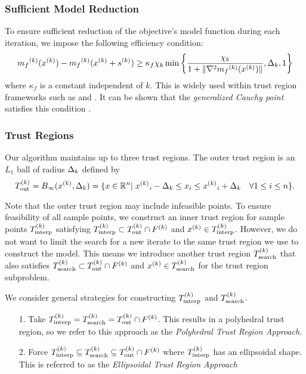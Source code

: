 \subsubsection{Sufficient Model Reduction}

To ensure sufficient reduction of the objective's model function during each iteration, we impose the following efficiency condition:
\begin{equation}
\label{efficiency}
{{m}_f}^{(k)}({x^{(k)}}) - {{m}_f}^{(k)}({x^{(k)}} + {{s}^{(k)}}) \ge \kappa_f \chi_k \min\left\{ \frac{\chi_k}{1+\|\nabla^2 {{m}_f}^{(k)}({x^{(k)}})\|}, \Delta_k, 1 \right\}
\end{equation}
where $\kappa_f$ is a constant independent of $k$.
This is widely used within trust region frameworks such as \cite{Conejo:2013:GCT:2620806.2621814} and \cite{Conn:2000:TM:357813}.
It can be shown that the \emph{generalized Cauchy point} satisfies this condition \cite{Conn:2000:TM:357813}.


\subsubsection{Trust Regions}
Our algorithm maintains up to three trust regions.
The outer trust region is an $L_1$ ball of radius $ \Delta_k $ defined by
\begin{equation}
\label{trust_region}
{T_{\text{out}}^{(k)}} = B_{\infty}({x^{(k)}},\Delta_k) = \{x\in \mathbb R^n | \; {{x^{(k)}}}_i - \Delta_k \le x_i \le {{x^{(k)}}}_i + \Delta_k \quad \forall 1\le i \le n\}.
\end{equation}

Note that the outer trust region may include infeasible points.
To ensure feasibility of all sample points, we construct an inner trust region for sample points $ {T_{\text{interp}}^{(k)}} $  satisfying 
${T_{\text{interp}}^{(k)}} \subset {T_{\text{out}}^{(k)}} \cap {F}^{(k)}$ and ${x^{(k)}} \in {T_{\text{interp}}^{(k)}} $.
However, we do not want to limit the search for a new iterate to the same trust region we use to construct the model.
This means we introduce another trust region $ {T_{\text{search}}^{(k)}} $ that also satisfies $ {T_{\text{search}}^{(k)}} \subset {T_{\text{out}}^{(k)}} \cap {F}^{(k)}$ and ${x^{(k)}} \in {T_{\text{search}}^{(k)}} $ for the trust region subproblem.


We consider general strategies for constructing $ {T_{\text{interp}}^{(k)}} $ and $ {T_{\text{search}}^{(k)}} $.
\begin{itemize}
\item[1.] Take $\label{redpill} {T_{\text{interp}}^{(k)}} = {T_{\text{search}}^{(k)}} = {T_{\text{out}}^{(k)}} \cap {F}^{(k)} $. This results in a polyhedral trust region, so we refer to this approach as the \emph{Polyhedral Trust Region Approach}.
\item[2.] Force $\label{bluepill} {T_{\text{interp}}^{(k)}} \subseteq {T_{\text{search}}^{(k)}} \subseteq {T_{\text{out}}^{(k)}} \cap {F}^{(k)} $ where ${T_{\text{interp}}^{(k)}}$ has an ellipsoidal shape. This is referred to as the \emph{Ellipsoidal Trust Region Approach}
\end{itemize}

